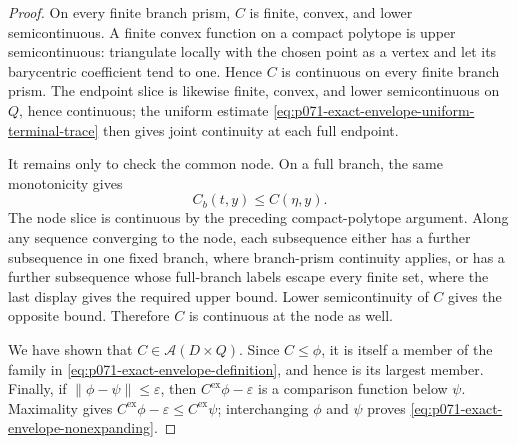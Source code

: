 \begin{proof}
On every finite branch prism, \(C\) is finite, convex, and lower
semicontinuous.  A finite convex function on a compact polytope is upper
semicontinuous: triangulate locally with the chosen point as a vertex and
let its barycentric coefficient tend to one.  Hence \(C\) is continuous on
every finite branch prism.  The endpoint slice is likewise finite, convex,
and lower semicontinuous on \(Q\), hence continuous; the uniform estimate
\eqref{eq:p071-exact-envelope-uniform-terminal-trace} then gives joint
continuity at each full endpoint.

It remains only to check the common node.  On a full branch, the same
monotonicity gives
\[
                         C_b(t,y)\leq C(\eta,y).
\]
The node slice is continuous by the preceding compact-polytope argument.
Along any sequence converging to the node, each subsequence either has a
further subsequence in one fixed branch, where branch-prism continuity
applies, or has a further subsequence whose full-branch labels escape every
finite set, where the last display gives the required upper bound.  Lower
semicontinuity of \(C\) gives the opposite bound.  Therefore \(C\) is
continuous at the node as well.

We have shown that \(C\in\mathcal A(D\times Q)\).  Since \(C\leq\phi\), it
is itself a member of the family in
\eqref{eq:p071-exact-envelope-definition}, and hence is its largest member.
Finally, if
\(\lVert\phi-\psi\rVert\leq\varepsilon\), then
\(C^{\mathrm{ex}}\phi-\varepsilon\) is a comparison function below
\(\psi\).  Maximality gives
\(C^{\mathrm{ex}}\phi-\varepsilon\leq C^{\mathrm{ex}}\psi\); interchanging
\(\phi\) and \(\psi\) proves
\eqref{eq:p071-exact-envelope-nonexpanding}.
\end{proof}
